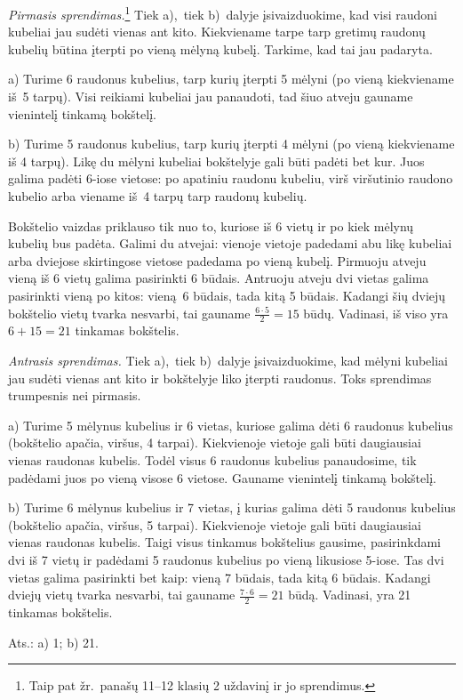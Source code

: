\documentclass[11pt,a4paper]{article}
\begin{document}
\textit{Pirmasis sprendimas.}\footnote{Taip pat žr.~panašų 11--12 klasių 2 uždavinį ir jo sprendimus.} Tiek a),~tiek b)~dalyje įsivaizduokime, kad visi raudoni kubeliai jau sudėti vienas ant kito. Kiekviename tarpe tarp gretimų raudonų kubelių būtina įterpti po vieną mėlyną kubelį. Tarkime, kad tai jau padaryta.

a) Turime 6 raudonus kubelius, tarp kurių įterpti 5 mėlyni (po vieną kiekviename iš~5 tarpų). Visi reikiami kubeliai jau panaudoti, tad šiuo atveju gauname vienintelį tinkamą bokštelį. 

b) Turime 5 raudonus kubelius, tarp kurių įterpti 4 mėlyni (po vieną kiekviename iš 4 tarpų). Likę du mėlyni kubeliai bokštelyje gali būti padėti bet kur. Juos galima padėti 6-iose vietose: po apatiniu raudonu kubeliu, virš viršutinio raudono kubelio arba viename iš~4 tarpų tarp raudonų kubelių.

Bokštelio vaizdas priklauso tik nuo to, kuriose iš 6 vietų ir po kiek mėlynų kubelių bus padėta. Galimi du atvejai: vienoje vietoje padedami abu likę kubeliai arba dviejose skirtingose vietose padedama po vieną kubelį. Pirmuoju atveju vieną iš 6 vietų galima pasirinkti 6 būdais. Antruoju atveju dvi vietas galima pasirinkti vieną po kitos: vieną~6 būdais, tada kitą 5 būdais. Kadangi šių dviejų bokštelio vietų tvarka nesvarbi, tai gauname $\frac{6\cdot 5}{2}=15$ būdų. Vadinasi, iš viso yra $6+15=21$ tinkamas bokštelis.
\vspace{0,3cm}

\textit{Antrasis sprendimas.} 
Tiek a),~tiek b)~dalyje įsivaizduokime, kad mėlyni kubeliai jau sudėti vienas ant kito ir bokštelyje liko įterpti raudonus. Toks sprendimas trumpesnis nei pirmasis.

a) Turime 5 mėlynus kubelius ir 6 vietas, kuriose galima dėti 6 raudonus kubelius (bokštelio apačia, viršus, 4 tarpai). Kiekvienoje vietoje gali būti daugiausiai vienas raudonas kubelis. Todėl visus 6 raudonus kubelius panaudosime, tik padėdami juos po vieną visose 6 vietose. Gauname vienintelį tinkamą bokštelį.

b) Turime 6 mėlynus kubelius ir 7 vietas, į kurias galima dėti 5 raudonus kubelius (bokštelio apačia, viršus, 5 tarpai). Kiekvienoje vietoje gali būti daugiausiai vienas raudonas kubelis. Taigi visus tinkamus bokštelius gausime, pasirinkdami dvi iš 7 vietų ir padėdami 5 raudonus kubelius po vieną likusiose 5-iose. Tas dvi vietas galima pasirinkti bet kaip: vieną 7 būdais, tada kitą 6 būdais. Kadangi dviejų vietų tvarka nesvarbi, tai gauname
$\frac{7\cdot6}{2}=21$ būdą. Vadinasi, yra 21 tinkamas bokštelis.
       \begin{flushright}
     Ats.: a) 1; b) 21.
    \end{flushright}
\vspace{6mm}
\end{document}
